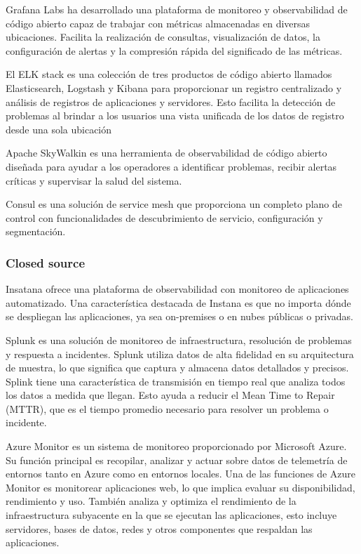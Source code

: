 \documentclass[a4paper,12pt]{article}
\begin{document}
Grafana Labs ha desarrollado una plataforma de monitoreo y observabilidad de código abierto capaz de trabajar con métricas almacenadas en diversas ubicaciones. Facilita la realización de consultas, visualización de datos, la configuración de alertas y la compresión rápida del significado de las métricas.
\vspace{12pt}

El ELK stack es una colección de tres productos de código abierto llamados Elasticsearch, Logstash y Kibana para proporcionar un registro centralizado y análisis de registros de aplicaciones y servidores. Esto facilita la detección de problemas al brindar a los usuarios una vista unificada de los datos de registro desde una sola ubicación
\vspace{12pt}

Apache SkyWalkin es una herramienta de observabilidad de código abierto diseñada para ayudar a los operadores a identificar problemas, recibir alertas críticas y supervisar la salud del sistema.
\vspace{12pt}

Consul es una solución de service mesh que proporciona un completo plano de control con funcionalidades de descubrimiento de servicio, configuración y segmentación.

\subsubsection{\small Closed source}
Insatana ofrece una plataforma de observabilidad con monitoreo de aplicaciones automatizado. Una característica destacada de Instana es que no importa dónde se despliegan las aplicaciones, ya sea on-premises o en nubes públicas o privadas.
\vspace{12pt}

Splunk es una solución de monitoreo de infraestructura, resolución de problemas y respuesta a incidentes. Splunk utiliza datos de alta fidelidad en su arquitectura de muestra, lo que significa que captura y almacena datos detallados y precisos. Splink tiene una característica de transmisión en tiempo real que analiza todos los datos a medida que llegan. Esto ayuda a reducir el Mean Time to Repair (MTTR), que es el tiempo promedio necesario para resolver un problema o incidente.
\vspace{12pt}

Azure Monitor es un sistema de monitoreo proporcionado por Microsoft Azure. Su función principal es recopilar, analizar y actuar sobre datos de telemetría de entornos tanto en Azure como en entornos locales. Una de las funciones de Azure Monitor es monitorear aplicaciones web, lo que implica evaluar su disponibilidad, rendimiento y uso. También analiza y optimiza el rendimiento de la infraestructura subyacente en la que se ejecutan las aplicaciones, esto incluye servidores, bases de datos, redes y otros componentes que respaldan las aplicaciones.
\vspace{12pt}
\end{document}
